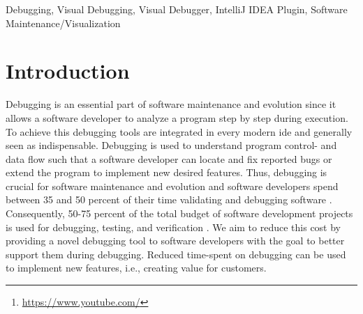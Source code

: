 \documentclass[conference]{IEEEtran}
\newcommand{\intellij}{IntelliJ IDEA}
\newcommand{\screencast}{\url{https://www.youtube.com/}}
\begin{document}
\begin{abstract}
\emph{Debugging} is an important activity in software development to understand control- and data flow in the source code.
Understanding the source code is a prerequisite to finding and fixing bugs or implementing new desired features. 
Traditionally information during program runtime is visualized in a textual manner while debugging.
However, we have developed a novel tool for visualizing program information as object diagrams, which is integrated as a plugin into the popular Java development environment \intellij{}.
Our tool is demonstrated in a typical usage scenario here\footnote{\screencast}.
\end{abstract}

\begin{IEEEkeywords}
Debugging, Visual Debugging, Visual Debugger, IntelliJ IDEA Plugin, Software Maintenance/Visualization
\end{IEEEkeywords}

\section{Introduction}
Debugging is an essential part of software maintenance and evolution since it allows a software developer to analyze a program step by step during execution.
To achieve this debugging tools are integrated in every modern \gls*{ide} and generally seen as indispensable.
Debugging is used to understand program control- and data flow such that a software developer can locate and fix reported bugs or extend the program to implement new desired features.
Thus, debugging is crucial for software maintenance and evolution and software developers spend between 35 and 50 percent of their time validating and debugging software \cite{odellDebuggingMindsetUnderstanding2017}.
Consequently, 50-75 percent of the total budget of software development projects is used for debugging, testing, and verification \cite{odellDebuggingMindsetUnderstanding2017}.
We aim to reduce this cost by providing a novel debugging tool to software developers with the goal to better support them during debugging.
Reduced time-spent on debugging can be used to implement new features, i.e., creating value for customers.
\end{document}
